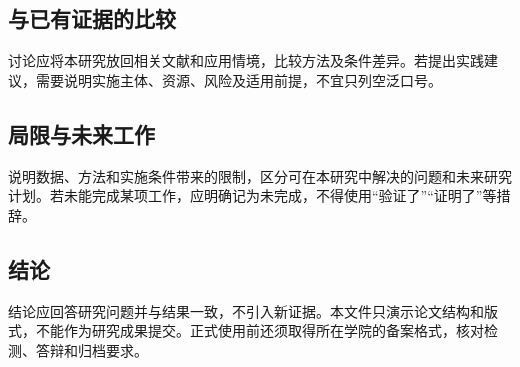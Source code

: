 \subsection{与已有证据的比较}
讨论应将本研究放回相关文献和应用情境，比较方法及条件差异。若提出实践建议，需要说明实施主体、资源、风险及适用前提，不宜只列空泛口号。
\subsection{局限与未来工作}
说明数据、方法和实施条件带来的限制，区分可在本研究中解决的问题和未来研究计划。若未能完成某项工作，应明确记为未完成，不得使用“验证了”“证明了”等措辞。
\subsection{结论}
结论应回答研究问题并与结果一致，不引入新证据。本文件只演示论文结构和版式，不能作为研究成果提交。正式使用前还须取得所在学院的备案格式，核对检测、答辩和归档要求。
